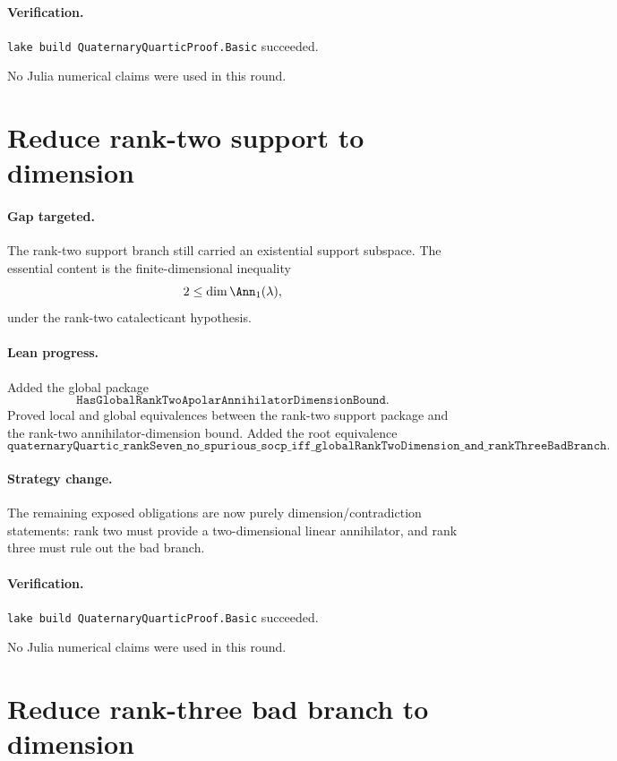 \documentclass[11pt]{article}
\begin{document}
\paragraph{Verification.}
\texttt{lake build QuaternaryQuarticProof.Basic} succeeded.

No Julia numerical claims were used in this round.

\section*{Reduce rank-two support to dimension}

\paragraph{Gap targeted.}
The rank-two support branch still carried an existential support subspace.
The essential content is the finite-dimensional inequality
\[
2\le \dim \Ann_1(\lambda),
\]
under the rank-two catalecticant hypothesis.

\paragraph{Lean progress.}
Added the global package
\[
\texttt{HasGlobalRankTwoApolarAnnihilatorDimensionBound}.
\]
Proved local and global equivalences between the rank-two support package and
the rank-two annihilator-dimension bound.  Added the root equivalence
\[
\texttt{quaternaryQuartic\_rankSeven\_no\_spurious\_socp\_iff\_globalRankTwoDimension\_and\_rankThreeBadBranch}.
\]

\paragraph{Strategy change.}
The remaining exposed obligations are now purely dimension/contradiction
statements: rank two must provide a two-dimensional linear annihilator, and
rank three must rule out the bad branch.

\paragraph{Verification.}
\texttt{lake build QuaternaryQuarticProof.Basic} succeeded.

No Julia numerical claims were used in this round.

\section*{Reduce rank-three bad branch to dimension}
\end{document}
